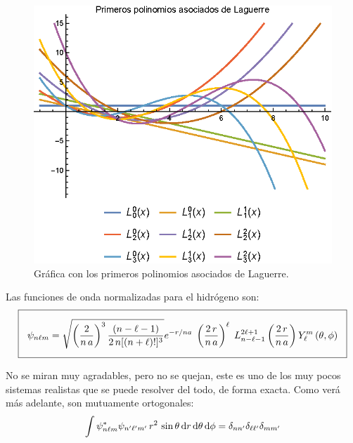 \begin{figure}[H]
    \centering
    \includegraphics[scale=1.3]{Imagenes/Polinomios_Laguerre_02.eps}
    \caption{Gráfica con los primeros polinomios asociados de Laguerre.}
    \label{fig:grafica_Laguerre_02}
\end{figure}

Las funciones de onda normalizadas para el hidrógeno son:
\begin{align}
\setlength{\fboxsep}{3\fboxsep}\boxed{
\psi_{n \ell m} = \sqrt{\left(\dfrac{2}{n \, a} \right)^{3} \dfrac{(n - \ell - 1)}{2 \, n[(n + \ell)!]^{3}}} e^{-r/na} \; \left( \dfrac{2 \, r}{n \, a} \right)^{\ell} \; L_{n - \ell -1}^{2 \ell + 1} \left( \dfrac{2 \, r}{n \, a} \right) Y_{\ell}^{m} \, (\theta, \phi)}
\label{eq:ecuacion_04_89}
\end{align}

No se miran muy agradables, pero no se quejan, este es uno de los muy pocos sistemas realistas que se puede resolver del todo, de forma exacta. Como verá más adelante, son mutuamente ortogonales:
\begin{align}
\int \psi_{n \ell m}^{*} \psi_{{n}^{\prime} {\ell}^{\prime} {m}^{\prime}} \, r^{2} \, \sin \theta \dd{r} \dd{\theta} \dd{\phi} =  \delta_{n {n}^{\prime}} \delta_{\ell {\ell}^{\prime}} \delta_{m {m}^{\prime}}
\label{eq:ecuacion_04_90}
\end{align}

